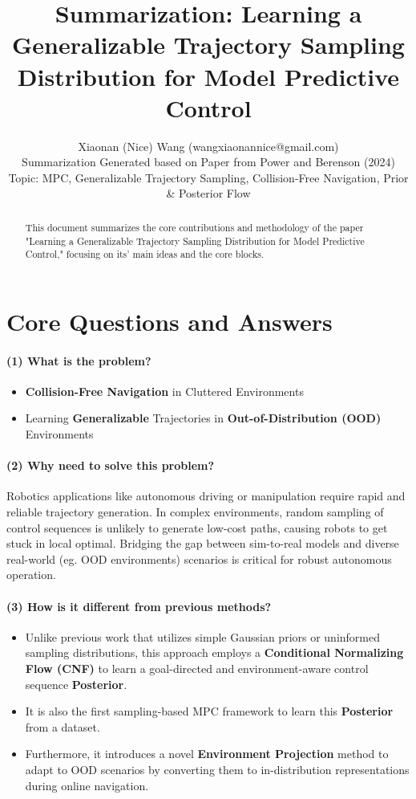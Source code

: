\documentclass{article}
\title{Summarization: Learning a Generalizable Trajectory Sampling Distribution for Model Predictive Control}
\author{%
  Xiaonan (Nice) Wang (wangxiaonannice@gmail.com) \\
  Summarization Generated based on Paper from Power and Berenson (2024) \\
  Topic: MPC, Generalizable Trajectory Sampling, Collision-Free Navigation, Prior \& Posterior Flow \\
}
\begin{document}
\maketitle

\begin{abstract}
This document summarizes the core contributions and methodology of the paper "Learning a Generalizable Trajectory Sampling Distribution for Model Predictive Control," focusing on its' main ideas and the core blocks.
\end{abstract}

\section{Core Questions and Answers}

\paragraph{(1) What is the problem?} 
\begin{itemize}
  \item \textbf{Collision-Free Navigation} in Cluttered Environments
  \item Learning \textbf{Generalizable} Trajectories in \textbf{Out-of-Distribution (OOD)} Environments
\end{itemize}

\paragraph{(2) Why need to solve this problem?} 
Robotics applications like autonomous driving or manipulation require rapid and reliable trajectory generation. In complex environments, random sampling of control sequences is unlikely to generate low-cost paths, causing robots to get stuck in local optimal. Bridging the gap between sim-to-real models and diverse real-world (eg. OOD environments) scenarios is critical for robust autonomous operation.

\paragraph{(3) How is it different from previous methods?} 
\begin{itemize}
  \item Unlike previous work that utilizes simple Gaussian priors or uninformed sampling distributions, this approach employs a \textbf{Conditional Normalizing Flow (CNF)} to learn a goal-directed and environment-aware control sequence \textbf{Posterior}.
  \item It is also the first sampling-based MPC framework to learn this \textbf{Posterior} from a dataset.
  \item Furthermore, it introduces a novel \textbf{Environment Projection} method to adapt to OOD scenarios by converting them to in-distribution representations during online navigation.
\end{itemize}
\end{document}
